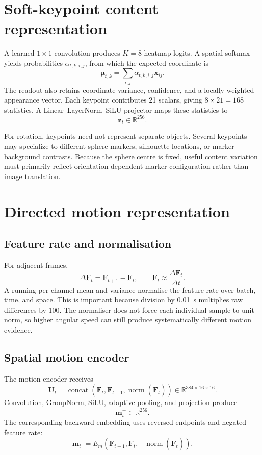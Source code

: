 \documentclass[11pt,a4paper]{article}
\newcommand{\R}{\mathbb R}
\newcommand{\vect}[1]{\mathbf{#1}}
\begin{document}
\section{Soft-keypoint content representation}
A learned $1\times1$ convolution produces $K=8$ heatmap logits. A spatial softmax yields probabilities $\alpha_{t,k,i,j}$, from which the expected coordinate is
\begin{equation}
\vect\mu_{t,k}=\sum_{i,j}\alpha_{t,k,i,j}\vect x_{ij}.
\end{equation}
The readout also retains coordinate variance, confidence, and a locally weighted appearance vector. Each keypoint contributes 21 scalars, giving $8\times21=168$ statistics. A Linear--LayerNorm--SiLU projector maps these statistics to
\begin{equation}
\vect z_t\in\R^{256}.
\end{equation}

For rotation, keypoints need not represent separate objects. Several keypoints may specialize to different sphere markers, silhouette locations, or marker-background contrasts. Because the sphere centre is fixed, useful content variation must primarily reflect orientation-dependent marker configuration rather than image translation.

\section{Directed motion representation}
\subsection{Feature rate and normalisation}
For adjacent frames,
\begin{equation}
\Delta\vect F_t=\vect F_{t+1}-\vect F_t,
\qquad
\dot{\vect F}_t\approx\frac{\Delta\vect F_t}{\Delta t}.
\end{equation}
A running per-channel mean and variance normalise the feature rate over batch, time, and space. This is important because division by \SI{0.01}{s} multiplies raw differences by 100. The normaliser does not force each individual sample to unit norm, so higher angular speed can still produce systematically different motion evidence.

\subsection{Spatial motion encoder}
The motion encoder receives
\begin{equation}
\vect U_t=\operatorname{concat}(\vect F_t,\vect F_{t+1},\operatorname{norm}(\dot{\vect F}_t))
\in\R^{384\times16\times16}.
\end{equation}
Convolution, GroupNorm, SiLU, adaptive pooling, and projection produce
\begin{equation}
\vect m_t^+\in\R^{256}.
\end{equation}
The corresponding backward embedding uses reversed endpoints and negated feature rate:
\begin{equation}
\vect m_t^-=E_m(\vect F_{t+1},\vect F_t,-\operatorname{norm}(\dot{\vect F}_t)).
\end{equation}
\end{document}
